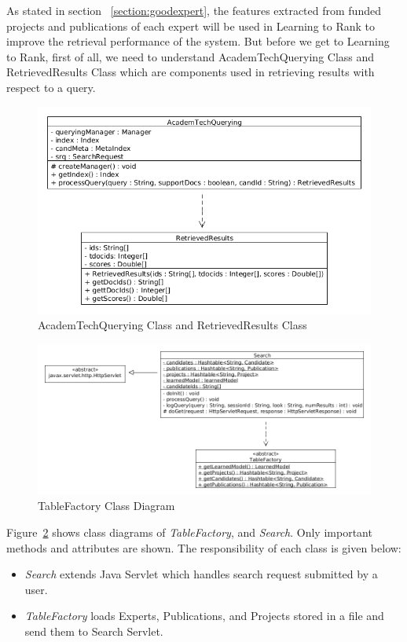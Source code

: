 As stated in section ~\ref{section:goodexpert}, the features extracted from funded projects and publications of each expert will be used in Learning to Rank
to improve the retrieval performance of the system. But before we get to Learning to Rank, first of all, we need to understand
AcademTechQuerying Class and RetrievedResults Class which are components used in retrieving results with respect to a query. 
\begin{figure}
\centering
\includegraphics[scale=0.4]{./figures/AcademTechQuerying.png}
\caption{AcademTechQuerying Class and RetrievedResults Class} \label{fig:AcademTechQuerying} 
\end{figure}

\begin{figure}
\centering
\includegraphics[scale=0.4]{./figures/tablefactory.png}
\caption{TableFactory Class Diagram} \label{fig:tableFactory} 
\end{figure}

Figure~\ref{fig:tableFactory} shows class diagrams of \textit{TableFactory}, and \textit{Search}. Only important methods and attributes are shown.
The responsibility of each class is given below:
\begin{itemize}
 \item \textit{Search} extends Java Servlet which handles search request submitted by a user.
 \item \textit{TableFactory} loads Experts, Publications, and Projects stored in a file and send them to Search Servlet.
\end{itemize}

